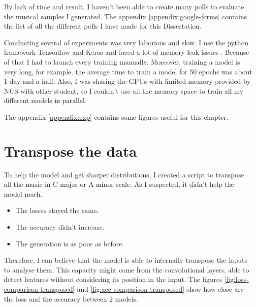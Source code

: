 \documentclass[12pt]{report}
\begin{document}
By lack of time and result, I haven't been able to create many polls to evaluate the musical samples I generated.
The appendix \ref{appendix:google-forms} contains the list of all the different polls I have made for this Dissertation.

Conducting several of experiments was very laborious and slow.
I use the python framework Tensorflow \cite{noauthor_tensorflow_nodate} and Keras \cite{noauthor_keras_nodate} and faced a lot of memory leak issues \cite{noauthor_memory_nodate-1, noauthor_memory_nodate-2}.
Because of that I had to launch every training manually.
Moreover, training a model is very long, for example, the average time to train a model for 50 epochs was about 1 day and a half.
Also, I was sharing the GPUs with limited memory provided by NUS with other student, so I couldn't use all the memory space to train all my different models in parallel.

The appendix \ref{appendix:exp} contains some figures useful for this chapter.

\section{Transpose the data}

To help the model and get sharper distributions, I created a script to transpose all the music in C major or A minor scale.
As I suspected, it didn't help the model much.
\begin{itemize}
    \item The losses stayed the same.
    \item The accuracy didn't increase.
    \item The generation is as poor as before.
\end{itemize}
Therefore, I can believe that the model is able to internally transpose the inputs to analyse them.
This capacity might come from the convolutional layers, able to detect features without considering its position in the input.
The figures \ref{fig:loss-comparison-transposed} and \ref{fig:acc-comparison-transposed} show how close are the loss and the accuracy between 2 models.
\end{document}
